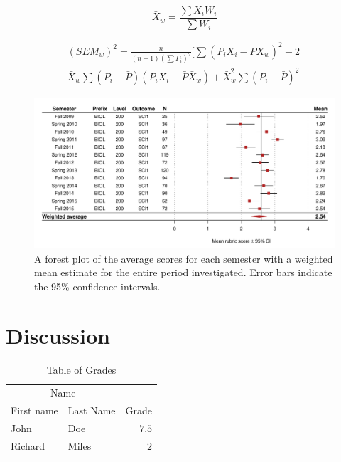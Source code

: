 \documentclass[fleqn,10pt]{SelfArx}\usepackage[]{graphicx}\usepackage[]{color}
\begin{document}
\begin{equation}
\bar{X}_w = \frac{\sum X_i W_i}{\sum W_i}
\label{eq:weightX}
\end{equation}

\begin{equation}
\begin{split}
(SEM_w)^2 = \frac{n}{(n-1)(\sum P_i)^2}\big[ \sum(P_i X_i - \bar{P}\bar{X}_w)^2 - 2 \\
\bar{X}_w \sum(P_i - \bar{P})(P_i X_ i - \bar{P} \bar{X}_w) + \bar{X}_w^2 \sum(P_i - \bar{P})^2 \big]
\label{eq:weightV}
\end{split}
\end{equation}

\begin{figure}[htb]\centering %

\includegraphics[width=\textwidth]{./figure/forest}
\protect\caption{A forest plot of the average scores for each semester with a weighted mean estimate for the entire period investigated. Error bars indicate the 95\% confidence intervals.}
\label{fig:forest.pdf}
\end{figure}

\lipsum[1] %
\lipsum[1]


\section{Discussion}

\lipsum[1] %

\lipsum[1] %

\begin{table}[hbt]
\caption{Table of Grades}
\centering
\begin{tabular}{llr}
\toprule
\multicolumn{2}{c}{Name} \\
\cmidrule(r){1-2}
First name & Last Name & Grade \\
\midrule
John & Doe & $7.5$ \\
Richard & Miles & $2$ \\
\bottomrule
\end{tabular}
\label{tab:label}
\end{table}
\end{document}
